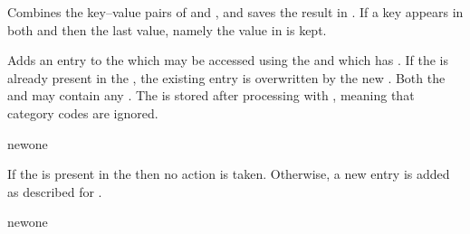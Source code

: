 \documentclass[oneside]{book}
\begin{document}
\begin{function}{\PropConcat}
\begin{syntax}
   
\end{syntax}
Combines the key--value pairs of  and
, and saves the result in .  If a
key appears in both  and  then the
last value, namely the value in  is kept.
\begin{codehigh}
\PropSetFromKeyval {}
\PropSetFromKeyval {}
\PropConcat \lTmpaProp \lTmpbProp \lTmpcProp
\PropVarLog \lTmpaProp
\end{codehigh}
\end{function}

\begin{function}{\PropPut}
\begin{syntax}
   
\end{syntax}
Adds an entry to the  which may be accessed
using the  and which has . If the 
is already present in the , the existing entry
is overwritten by the new . Both the  and
 may contain any . The  is
stored after processing with , meaning that category
codes are ignored.
\begin{codehigh}
\PropSetFromKeyval {}
\PropPut {} {newone}
\PropVarLog \lTmpaProp
\end{codehigh}
\end{function}

\begin{function}{\PropPutIfNew}
\begin{syntax}
   
\end{syntax}
If the  is present in the  then no
action is taken. Otherwise, a new entry is added as described for
.
\begin{codehigh}
\PropSetFromKeyval {}
\PropPutIfNew {} {newone}
\PropVarLog \lTmpaProp
\end{codehigh}
\end{function}
\end{document}
